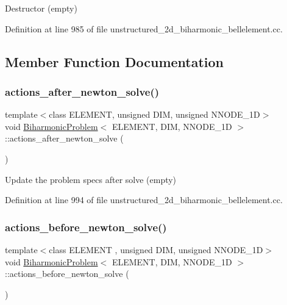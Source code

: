 Destructor (empty) 



Definition at line 985 of file unstructured\+\_\+2d\+\_\+biharmonic\+\_\+bellelement.\+cc.



\subsection{Member Function Documentation}
\mbox{\label{classBiharmonicProblem_ac48f3f4d5164572e711103d7c58de9ed}} 
\subsubsection{\texorpdfstring{actions\+\_\+after\+\_\+newton\+\_\+solve()}{actions\_after\_newton\_solve()}}
{\footnotesize\ttfamily template$<$class E\+L\+E\+M\+E\+NT, unsigned D\+IM, unsigned N\+N\+O\+D\+E\+\_\+1D$>$ \\
void \hyperlink{classBiharmonicProblem}{Biharmonic\+Problem}$<$ E\+L\+E\+M\+E\+NT, D\+IM, N\+N\+O\+D\+E\+\_\+1D $>$\+::actions\+\_\+after\+\_\+newton\+\_\+solve (\begin{DoxyParamCaption}{ }\end{DoxyParamCaption})\hspace{0.3cm}{\ttfamily [inline]}}



Update the problem specs after solve (empty) 



Definition at line 994 of file unstructured\+\_\+2d\+\_\+biharmonic\+\_\+bellelement.\+cc.

\mbox{\label{classBiharmonicProblem_ac159c323626ae0514dac820b3f1a2ffb}} 
\subsubsection{\texorpdfstring{actions\+\_\+before\+\_\+newton\+\_\+solve()}{actions\_before\_newton\_solve()}}
{\footnotesize\ttfamily template$<$class E\+L\+E\+M\+E\+NT , unsigned D\+IM, unsigned N\+N\+O\+D\+E\+\_\+1D$>$ \\
void \hyperlink{classBiharmonicProblem}{Biharmonic\+Problem}$<$ E\+L\+E\+M\+E\+NT, D\+IM, N\+N\+O\+D\+E\+\_\+1D $>$\+::actions\+\_\+before\+\_\+newton\+\_\+solve (\begin{DoxyParamCaption}{ }\end{DoxyParamCaption})}



